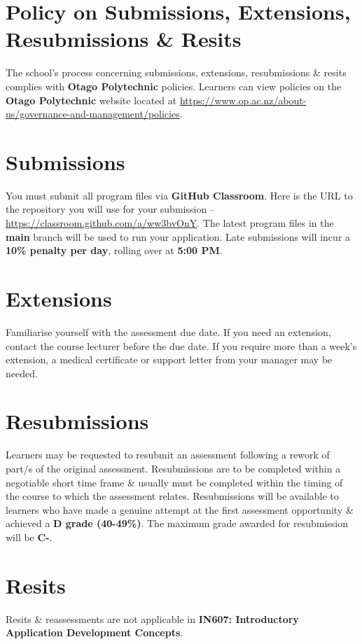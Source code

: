 \documentclass{article}
\begin{document}
\section*{Policy on Submissions, Extensions, Resubmissions \& Resits}
The school's process concerning submissions, extensions, resubmissions \& resits complies with \textbf{Otago Polytechnic} policies. Learners can view policies on the \textbf{Otago Polytechnic} website located at \href{https://www.op.ac.nz/about-us/governance-and-management/policies}{https://www.op.ac.nz/about-us/governance-and-management/policies}.

\section*{Submissions}
You must submit all program files via \textbf{GitHub Classroom}. Here is the URL to the repository you will use for your submission – \href{https://classroom.github.com/a/ww3bvOnY}{https://classroom.github.com/a/ww3bvOnY}. The latest program files in the \textbf{main} branch will be used to run your application. Late submissions will incur a \textbf{10\% penalty per day}, rolling over at \textbf{5:00 PM}.

\section*{Extensions}
Familiarise yourself with the assessment due date. If you need an extension, contact the course lecturer before the due date. If you require more than a week's extension, a medical certificate or support letter from your manager may be needed.

\section*{Resubmissions}
Learners may be requested to resubmit an assessment following a rework of part/s of the original assessment. Resubmissions are to be completed within a negotiable short time frame \& usually must be completed within the timing of the course to which the assessment relates. Resubmissions will be available to learners who have made a genuine attempt at the first assessment opportunity \& achieved a \textbf{D grade (40-49\%)}. The maximum grade awarded for resubmission will be \textbf{C-}.

\section*{Resits}
Resits \& reassessments are not applicable in \textbf{IN607: Introductory Application Development Concepts}. 
\end{document}
